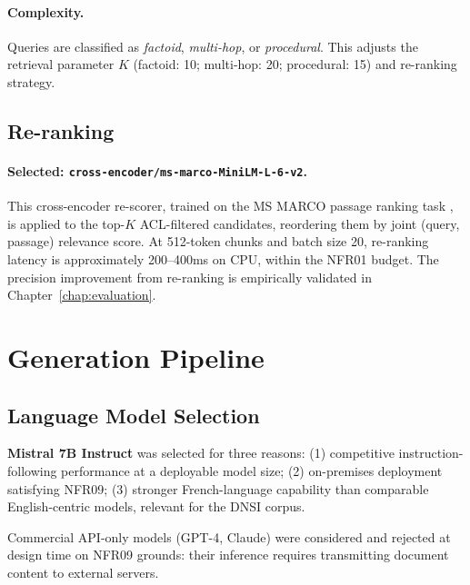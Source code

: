 \paragraph{Complexity.} Queries are classified as \textit{factoid}, \textit{multi-hop}, or \textit{procedural}. This adjusts the retrieval parameter $K$ (factoid: 10; multi-hop: 20; procedural: 15) and re-ranking strategy.

\subsection{Re-ranking}
\label{subsec:reranking}

\paragraph{Selected: \texttt{cross-encoder/ms-marco-MiniLM-L-6-v2}.} This cross-encoder re-scorer, trained on the MS MARCO passage ranking task \citep{SBERTCrossEncoder2024, Nogueira2019}, is applied to the top-$K$ ACL-filtered candidates, reordering them by joint (query, passage) relevance score. At 512-token chunks and batch size 20, re-ranking latency is approximately 200--400ms on CPU, within the NFR01 budget. The precision improvement from re-ranking is empirically validated in Chapter~\ref{chap:evaluation}.

\section{Generation Pipeline}
\label{sec:arch-generation}

\subsection{Language Model Selection}

\textbf{Mistral 7B Instruct} \citep{Jiang2023} was selected for three reasons: (1) competitive instruction-following performance at a deployable model size; (2) on-premises deployment satisfying NFR09; (3) stronger French-language capability than comparable English-centric models, relevant for the DNSI corpus.

Commercial API-only models (GPT-4, Claude) were considered and rejected at design time on NFR09 grounds: their inference requires transmitting document content to external servers.

